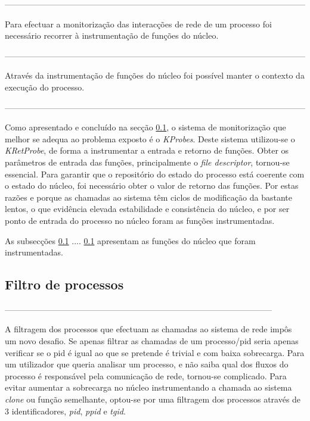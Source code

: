 ------------------------------------------------------------------------------------------------------------

Para efectuar a monitorização das interacções de rede de um processo foi necessário recorrer à instrumentação de funções do núcleo.

------------------------------------------------------------------------------------------------------------

Através da instrumentação de funções do núcleo foi possível manter o contexto da execução do processo.

------------------------------------------------------------------------------------------------------------

Como apresentado e concluído na secção \ref{}, o sistema de monitorização que melhor se adequa ao problema exposto é o \textit{KProbes}.
 Deste sistema utilizou-se o \textit{KRetProbe}, de forma a instrumentar a entrada e retorno de funções.
 Obter os parâmetros de entrada das funções, principalmente o \textit{file descriptor}, tornou-se essencial.
 Para garantir que o repositório do estado do processo está coerente com o estado do núcleo, foi necessário obter o valor de retorno das funções.
 Por estas razões e porque as chamadas ao sistema têm ciclos de modificação da bastante lentos, o que evidência elevada estabilidade e consistência do núcleo, e por ser ponto de entrada do processo no núcleo foram as funções instrumentadas.

As subsecções \ref{} .... \ref{} apresentam as funções do núcleo que foram instrumentadas.

%
%

\subsection{Filtro de processos}
------------------------------------------------------------------------------------------------

A filtragem dos processos que efectuam as chamadas ao sistema de rede impôs um novo desafio.
 Se apenas filtrar as chamadas de um processo/pid seria apenas verificar se o pid é igual ao que se pretende é trivial e com baixa sobrecarga.
 Para um utilizador que queria analisar um processo, e não saiba qual dos fluxos do processo é responsável pela comunicação de rede, tornou-se complicado.
 Para evitar aumentar a sobrecarga no núcleo instrumentando a chamada ao sistema \textit{clone} ou função semelhante, optou-se por uma filtragem dos processos através de 3 identificadores, \textit{pid}, \textit{ppid} e \textit{tgid}.

